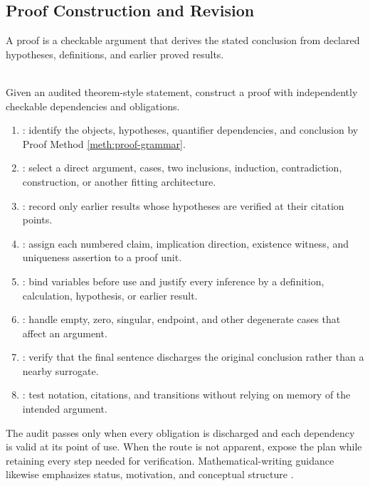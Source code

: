 \subsection{Proof Construction and Revision}

A proof is a checkable argument that derives the stated conclusion from declared hypotheses, definitions, and earlier proved results.

\begin{proofmethod} \label{meth:proof-construction-audit} \\
Given an audited theorem-style statement, construct a proof with independently checkable dependencies and obligations.
\begin{enumerate}[label=(\roman*)]
\setlength{\itemsep}{0pt}
\item {}: identify the objects, hypotheses, quantifier dependencies, and conclusion by Proof Method \ref{meth:proof-grammar}.
\item {}: select a direct argument, cases, two inclusions, induction, contradiction, construction, or another fitting architecture.
\item {}: record only earlier results whose hypotheses are verified at their citation points.
\item {}: assign each numbered claim, implication direction, existence witness, and uniqueness assertion to a proof unit.
\item {}: bind variables before use and justify every inference by a definition, calculation, hypothesis, or earlier result.
\item {}: handle empty, zero, singular, endpoint, and other degenerate cases that affect an argument.
\item {}: verify that the final sentence discharges the original conclusion rather than a nearby surrogate.
\item {}: test notation, citations, and transitions without relying on memory of the intended argument.
\end{enumerate}
The audit passes only when every obligation is discharged and each dependency is valid at its point of use. When the route is not apparent, expose the plan while retaining every step needed for verification. Mathematical-writing guidance likewise emphasizes status, motivation, and conceptual structure \citep{mit1998mathematicalwriting,knuth1988mathematicalwriting}.
\end{proofmethod}

